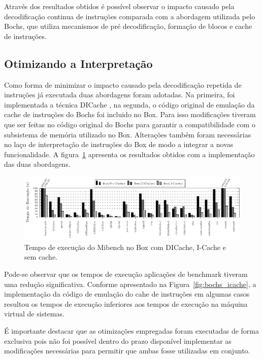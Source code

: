 \documentclass[11pt,twoside]{article}
\begin{document}
Através dos resultados obtidos é possível observar o impacto causado pela
decodificação continua de instruções comparada com a abordagem utilizada pelo
Bochs, que utiliza mecanismos de pré decodificação, formação de blocos e cache
de instruções.

\subsection{Otimizando a Interpretação}

Como forma de minimizar o impacto causado pela decodificação repetida de
instruções já executada duas abordagens foram adotadas. Na primeira, foi
implementada a técnica DICache \cite{dicache}, na segunda, o código original de
emulação da cache de instruções do Bochs foi incluido no Box. Para isso
modificações tiveram que ser feitas no código original do Bochs para garantir a
compatibilidade com o subsistema de memória utilizado no Box. Alterações também
foram necessárias no laço de interpretação de instruções do Box de modo a
integrar a novas funcionalidade. A figura~\ref{fig:dicache_nocache} apresenta os
resultados obtidos com a implementação das duas abordagens.

\begin{figure}[h]
	\centering
	\includegraphics[width=1.0\textwidth]{figures/dicache_nocache}
	\caption{Tempo de execução do Mibench no Box com DICache, I-Cache e sem cache.}
	\label{fig:dicache_nocache}
\end{figure}

Pode-se observar que os tempos de execução aplicações de benchmark tiveram uma
redução significativa. Conforme apresentado na Figura~\ref{fig:bochs_icache}, a
implementação da código de emulação do cahe de instruções em algumas casos
resultou os tempos de execução inferiores aos tempos de execução na máquina
virtual de sistemas.

É importante destacar que as otimizações empregadas foram executadas de forma
exclusiva pois não foi possível dentro do prazo disponível implementar as
modificações necessárias para permitir que ambas fosse utilizadas em conjunto.
\end{document}
